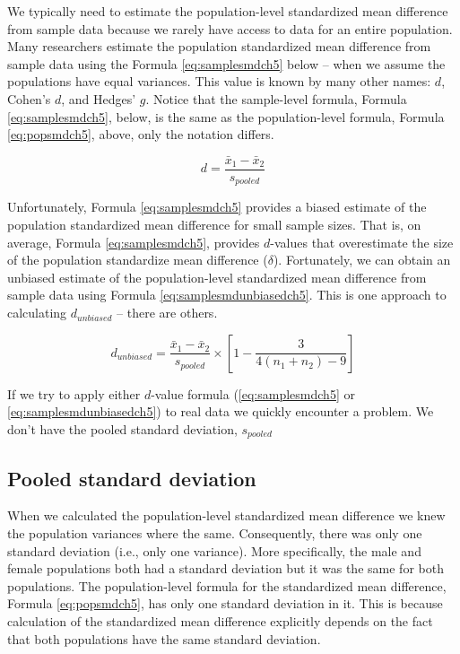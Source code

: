 \documentclass[
]{krantz}
\begin{document}
We typically need to estimate the population-level standardized mean difference from sample data because we rarely have access to data for an entire population. Many researchers estimate the population standardized mean difference from sample data using the Formula \eqref{eq:samplesmdch5} below -- when we assume the populations have equal variances. This value is known by many other names: \(d\), Cohen's \(d\), and Hedges' \(g\). Notice that the sample-level formula, Formula \eqref{eq:samplesmdch5}, below, is the same as the population-level formula, Formula \eqref{eq:popsmdch5}, above, only the notation differs.

\begin{equation} 
d  = \frac{\bar{x}_{1} - \bar{x}_{2}}{s_{pooled}} 
      \label{eq:samplesmdch5}
\end{equation}

Unfortunately, Formula \eqref{eq:samplesmdch5} provides a biased estimate of the population standardized mean difference for small sample sizes. That is, on average, Formula \eqref{eq:samplesmdch5}, provides \(d\)-values that overestimate the size of the population standardize mean difference (\(\delta\)). Fortunately, we can obtain an unbiased estimate of the population-level standardized mean difference from sample data using Formula \eqref{eq:samplesmdunbiasedch5}. This is one approach to calculating \(d_{unbiased}\) -- there are others.

\begin{equation} 
d_{unbiased}  = \frac{\bar{x}_{1} - \bar{x}_{2}}{s_{pooled}} \times [1 - \frac{3}{4(n_1 + n_2)-9}]
      \label{eq:samplesmdunbiasedch5}
\end{equation}

If we try to apply either \(d\)-value formula (\eqref{eq:samplesmdch5} or \eqref{eq:samplesmdunbiasedch5}) to real data we quickly encounter a problem. We don't have the pooled standard deviation, \(s_{pooled}\)

\hypertarget{pooled-standard-deviation}{%
\subsection{Pooled standard deviation}\label{pooled-standard-deviation}}

When we calculated the population-level standardized mean difference we knew the population variances where the same. Consequently, there was only one standard deviation (i.e., only one variance). More specifically, the male and female populations both had a standard deviation but it was the same for both populations. The population-level formula for the standardized mean difference, Formula \eqref{eq:popsmdch5}, has only one standard deviation in it. This is because calculation of the standardized mean difference explicitly depends on the fact that both populations have the same standard deviation.
\end{document}
